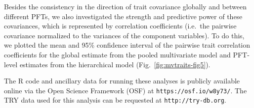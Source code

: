 Besides the consistency in the direction of trait covariance globally and between different PFTs, we also investigated the strength and predictive power of these covariances, which is represented by correlation coefficients (i.e.\ the pairwise covariance normalized to the variances of the component variables).
To do this, we plotted the mean and 95\% confidence interval of the pairwise trait correlation coefficients for the global estimate from the pooled multivariate model and PFT-level estimates from the hierarchical model (Fig.~\ref{fig:mvtraits-fig5}).

The R code and ancillary data for running these analyses is publicly available online via the Open Science Framework (OSF) at \texttt{https://osf.io/w8y73/}.
The TRY data used for this analysis can be requested at \texttt{http://try-db.org}.

